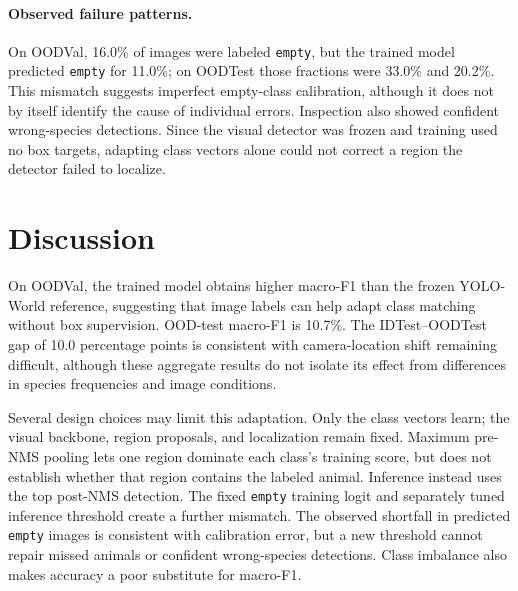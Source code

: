 \documentclass{article}
\begin{document}
\paragraph{Observed failure patterns.}
On OODVal, 16.0\% of images were labeled \texttt{empty}, but the trained model
predicted \texttt{empty} for 11.0\%; on OODTest those fractions were 33.0\% and
20.2\%. This mismatch suggests imperfect empty-class calibration, although it
does not by itself identify the cause of individual errors. Inspection also showed
confident wrong-species detections. Since the visual detector was frozen and
training used no box targets, adapting class vectors alone could not correct a
region the detector failed to localize.

\section{Discussion}
On OODVal, the trained model obtains higher macro-F1 than the frozen YOLO-World
reference, suggesting that image labels can help adapt class matching without
box supervision. OOD-test macro-F1 is 10.7\%. The IDTest--OODTest gap of
10.0 percentage points is consistent with camera-location shift remaining
difficult, although these aggregate results do not isolate its effect from
differences in species frequencies and image conditions.

Several design choices may limit this adaptation. Only the class vectors learn;
the visual backbone, region proposals, and localization remain fixed. Maximum
pre-NMS pooling lets one region dominate each class's training score, but does not
establish whether that region contains the labeled animal. Inference instead uses
the top post-NMS detection. The fixed \texttt{empty} training logit and separately
tuned inference threshold create a further mismatch. The observed shortfall in
predicted \texttt{empty} images is consistent with calibration error, but a new
threshold cannot repair missed animals or confident wrong-species detections.
Class imbalance also makes accuracy a poor substitute for macro-F1.
\end{document}
